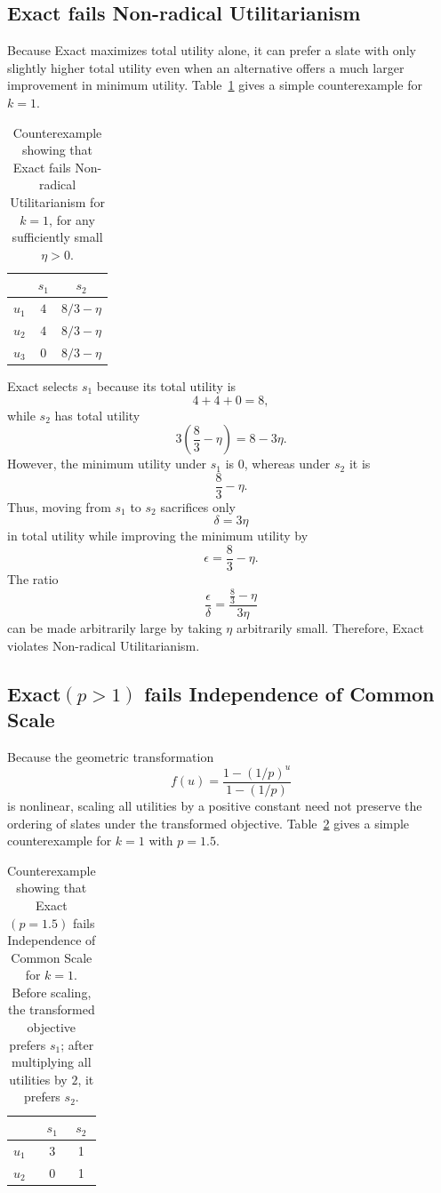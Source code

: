 \documentclass[11pt]{article}
\begin{document}
\subsection{Exact fails Non-radical Utilitarianism}
Because Exact maximizes total utility alone, it can prefer a slate with only slightly higher total utility even when an alternative offers a much larger improvement in minimum utility. Table~\ref{tab:failure-exact-nru} gives a simple counterexample for $k=1$.

\begin{table}[t]
\centering
\begin{tabular}{lcc}
\hline
 & $s_1$ & $s_2$ \\
\hline
$u_1$ & $4$ & $8/3-\eta$ \\
$u_2$ & $4$ & $8/3-\eta$ \\
$u_3$ & $0$ & $8/3-\eta$ \\
\hline
\end{tabular}
\caption{Counterexample showing that Exact fails Non-radical Utilitarianism for $k=1$, for any sufficiently small $\eta>0$.}
\label{tab:failure-exact-nru}
\end{table}

Exact selects $s_1$ because its total utility is
\[
4+4+0 = 8,
\]
while $s_2$ has total utility
\[
3\left(\frac{8}{3}-\eta\right)=8-3\eta.
\]
However, the minimum utility under $s_1$ is $0$, whereas under $s_2$ it is
\[
\frac{8}{3}-\eta.
\]
Thus, moving from $s_1$ to $s_2$ sacrifices only
\[
\delta = 3\eta
\]
in total utility while improving the minimum utility by
\[
\epsilon = \frac{8}{3}-\eta.
\]
The ratio
\[
\frac{\epsilon}{\delta}
=
\frac{\frac{8}{3}-\eta}{3\eta}
\]
can be made arbitrarily large by taking $\eta$ arbitrarily small. Therefore, Exact violates Non-radical Utilitarianism.


\subsection{Exact$(p>1)$ fails Independence of Common Scale}
Because the geometric transformation
\[
f(u)=\frac{1-(1/p)^u}{1-(1/p)}
\]
is nonlinear, scaling all utilities by a positive constant need not preserve the ordering of slates under the transformed objective. Table~\ref{tab:failure-exact-scale} gives a simple counterexample for $k=1$ with $p=1.5$.

\begin{table}[t]
\centering
\begin{tabular}{lcc}
\hline
 & $s_1$ & $s_2$ \\
\hline
$u_1$ & 3 & 1 \\
$u_2$ & 0 & 1 \\
\hline
\end{tabular}
\caption{Counterexample showing that Exact$(p=1.5)$ fails Independence of Common Scale for $k=1$. Before scaling, the transformed objective prefers $s_1$; after multiplying all utilities by $2$, it prefers $s_2$.}
\label{tab:failure-exact-scale}
\end{table}
\end{document}
